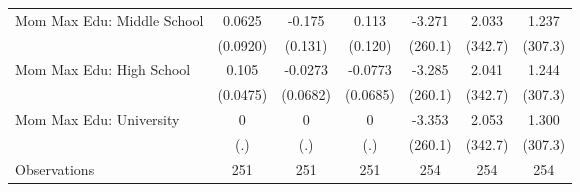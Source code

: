 {\begin{tabular}{l*{6}{c}}
\addlinespace
Mom Max Edu: Middle School&      0.0625         &      -0.175         &       0.113         &      -3.271         &       2.033         &       1.237         \\
                    &    (0.0920)         &     (0.131)         &     (0.120)         &     (260.1)         &     (342.7)         &     (307.3)         \\
\addlinespace
Mom Max Edu: High School&       0.105\sym{*}  &     -0.0273         &     -0.0773         &      -3.285         &       2.041         &       1.244         \\
                    &    (0.0475)         &    (0.0682)         &    (0.0685)         &     (260.1)         &     (342.7)         &     (307.3)         \\
\addlinespace
Mom Max Edu: University&           0         &           0         &           0         &      -3.353         &       2.053         &       1.300         \\
                    &         (.)         &         (.)         &         (.)         &     (260.1)         &     (342.7)         &     (307.3)         \\
\midrule
Observations        &         251         &         251         &         251         &         254         &         254         &         254         \\
\bottomrule
\end{tabular}
}
